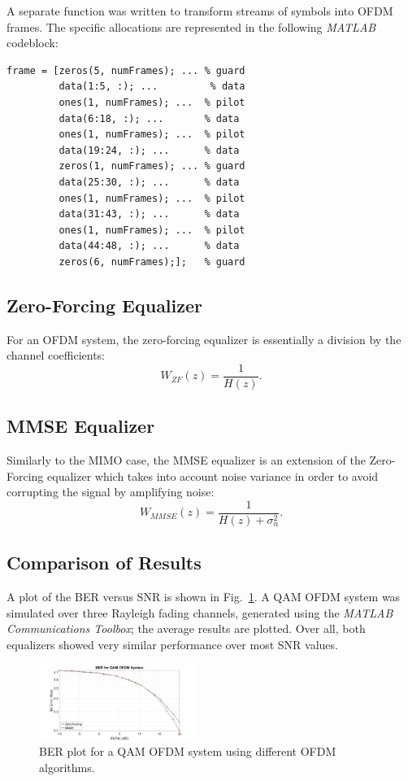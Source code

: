 \documentclass[journal]{IEEEtran}
\begin{document}
A separate function was written to transform streams of symbols into OFDM frames. The specific allocations are represented in the following \emph{MATLAB} codeblock:
\begin{verbatim}
frame = [zeros(5, numFrames); ... % guard
         data(1:5, :); ...	       % data
         ones(1, numFrames); ...  % pilot
         data(6:18, :); ...       % data
         ones(1, numFrames); ...  % pilot
         data(19:24, :); ...      % data
         zeros(1, numFrames); ... % guard
         data(25:30, :); ...      % data
         ones(1, numFrames); ...  % pilot
         data(31:43, :); ...      % data
         ones(1, numFrames); ...  % pilot
         data(44:48, :); ...      % data
         zeros(6, numFrames);];   % guard
\end{verbatim}

\subsection{Zero-Forcing Equalizer}
For an OFDM system, the zero-forcing equalizer is essentially a division by the channel coefficients:
\begin{equation}
W_{ZF}(z) = \frac{1}{H(z)}.
\end{equation}

\subsection{MMSE Equalizer}
Similarly to the MIMO case, the MMSE equalizer is an extension of the Zero-Forcing equalizer which takes into account noise variance in order to avoid corrupting the signal by amplifying noise:
\begin{equation}
W_{MMSE}(z) = \frac{1}{H(z) + \sigma^2_n}.
\end{equation}

\subsection{Comparison of Results}
A plot of the BER versus SNR is shown in Fig.~\ref{fig:ofdm_res}. A QAM OFDM system was simulated over three Rayleigh fading channels, generated using the \emph{MATLAB Communications Toolbox}; the average results are plotted. Over all, both equalizers showed very similar performance over most SNR values.

\begin{figure}[!htbp]
    \centering
    \includegraphics[width = 0.45\textwidth]{OFDM.jpg}
    \caption{BER plot for a QAM OFDM system using different OFDM algorithms.}
    \label{fig:ofdm_res}
\end{figure}
\end{document}
